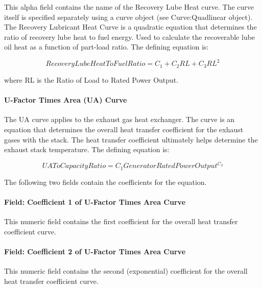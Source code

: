 This alpha field contains the name of the Recovery Lube Heat curve. The curve itself is specified separately using a curve object (see Curve:Quadlinear object). The Recovery Lubricant Heat Curve is a quadratic equation that determines the ratio of recovery lube heat to fuel energy. Used to calculate the recoverable lube oil heat as a function of part-load ratio. The defining equation is:

\begin{equation}
RecoveryLubeHeatToFuelRatio = {C_1} + {C_2}RL + {C_3}R{L^2}
\end{equation}

where RL is the Ratio of Load to Rated Power Output.

\paragraph{U-Factor Times Area (UA) Curve}\label{u-factor-times-area-ua-curve-1}

The UA curve applies to the exhaust gas heat exchanger. The curve is an equation that determines the overall heat transfer coefficient for the exhaust gases with the stack. The heat transfer coefficient ultimately helps determine the exhaust stack temperature. The defining equation is:

\begin{equation}
UAToCapacityRatio = {C_1}GeneratorRatedPowerOutpu{t^{{C_2}}}
\end{equation}

The following two fields contain the coefficients for the equation.

\paragraph{Field: Coefficient 1 of U-Factor Times Area Curve}\label{field-coefficient-1-of-u-factor-times-area-curve-1}

This numeric field contains the first coefficient for the overall heat transfer coefficient curve.

\paragraph{Field: Coefficient 2 of U-Factor Times Area Curve}\label{field-coefficient-2-of-u-factor-times-area-curve-1}

This numeric field contains the second (exponential) coefficient for the overall heat transfer coefficient curve.

